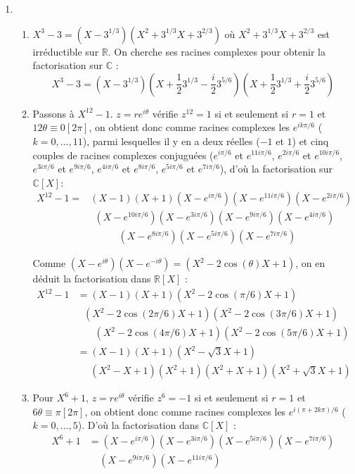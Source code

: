\documentclass[11pt,a4paper]{article}
\newcommand{\Rr}{\mathbb{R}} \newcommand{\R}{\mathbb{R}}
\newcommand{\Cc}{\mathbb{C}} \newcommand{\C}{\mathbb{C}}
\begin{document}
\begin{enumerate}
\item \begin{enumerate}
\item $X^3-3=(X-3^{1/3})(X^2+3^{1/3}X+3^{2/3})$ où $X^2+3^{1/3}X+3^{2/3}$ 
est irréductible sur $\R$. On cherche ses racines complexes 
pour obtenir la factorisation sur $\Cc$ :
$$X^3-3=(X-3^{1/3})(X+\frac{1}{2}3^{1/3}-\frac{i}{2}3^{5/6})(X+\frac{1}{2}3^{1/3}+\frac{i}{2}3^{5/6})$$

\item Passons à $X^{12}-1$. $z=re^{i\theta}$ vérifie $z^{12}=1$ si et seulement 
si $r=1$ et $12\theta\equiv 0 [2\pi]$, on obtient donc comme racines 
complexes les $e^{ik\pi/6}$ ($k=0,\ldots,11$), 
parmi lesquelles il y en a deux réelles ($-1$ et $1$) et cinq couples de 
racines complexes conjuguées 
($e^{i\pi/6}$ et $e^{11i\pi/6}$, $e^{2i\pi/6}$ et $e^{10i\pi/6}$, 
$e^{3i\pi/6}$ et $e^{9i\pi/6}$, $e^{4i\pi/6}$ et $e^{8i\pi/6}$, 
$e^{5i\pi/6}$ et $e^{7i\pi/6}$), d'où la factorisation sur $\Cc[X]$:
$$\begin{array}{rl}
X^{12}-1=&(X-1)(X+1)(X-e^{i\pi/6})(X-e^{11i\pi/6})(X-e^{2i\pi/6})\\
         & \ \ (X-e^{10i\pi/6})(X-e^{3i\pi/6})(X-e^{9i\pi/6})(X-e^{4i\pi/6})\\
 & \ \ \ \ \ \ \ \ \ \ \ \ \ (X-e^{8i\pi/6})(X-e^{5i\pi/6})(X-e^{7i\pi/6})
\end{array}$$

Comme $(X-e^{i\theta})(X-e^{-i\theta})=(X^2-2\cos(\theta)X+1)$, on en déduit la factorisation dans $\Rr[X]$ :
$$\begin{array}{rl}
X^{12}-1&=(X-1)(X+1)(X^2-2\cos(\pi/6)X+1)\\ 
 &\ \ \ (X^2-2\cos(2\pi/6)X+1)(X^2-2\cos(3\pi/6)X+1)\\
 &\ \ \ \ \ \ \ \ (X^2-2\cos(4\pi/6)X+1)(X^2-2\cos(5\pi/6)X+1)\\
 &=(X-1)(X+1)(X^2-\sqrt{3}X+1)\\
 &\ \ \ \ \ \ (X^2-X+1)(X^2+1)(X^2+X+1)(X^2+\sqrt{3}X+1)
\end{array}$$

\item Pour $X^6+1$, $z=re^{i\theta}$ vérifie $z^{6}=-1$ si et seulement 
si $r=1$ et $6\theta\equiv \pi [2\pi]$, on obtient donc comme racines 
complexes les $e^{i(\pi+2k\pi)/6}$ ($k=0,\ldots,5$). D'où la factorisation dans $\Cc[X]$ :
$$\begin{array}{rl}
X^6+1 &=(X-e^{i\pi/6})(X-e^{3i\pi/6})(X-e^{5i\pi/6})(X-e^{7i\pi/6})\\
  &\ \ \ \ \ (X-e^{9i\pi/6})(X-e^{11i\pi/6})
\end{array}$$


\end{enumerate}
\end{enumerate}
\end{document}
